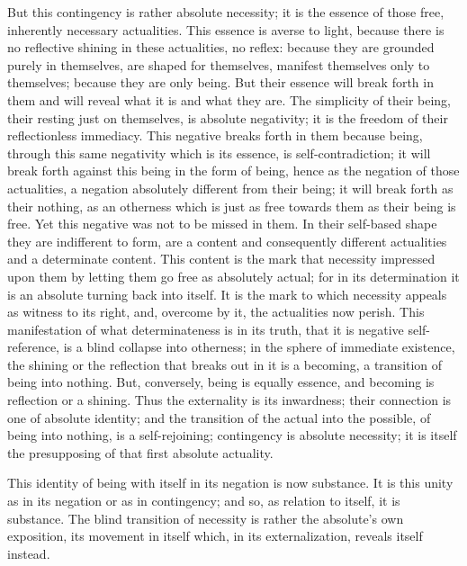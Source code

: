 But this contingency is rather absolute necessity;
it is the essence of those free, inherently necessary actualities.
This essence is averse to light, because there is
no reflective shining in these actualities,
no reflex: because they
are  grounded purely in themselves,
are shaped for themselves,
manifest themselves only to themselves;
because they are only being.
But their essence will break forth in them
and will reveal what it is and what they are.
The simplicity of their being, their resting just on themselves,
is absolute negativity; it is the freedom of their reflectionless immediacy.
This negative breaks forth in them because being,
through this same negativity which is its essence, is self-contradiction;
it will break forth against this being in the form of being,
hence as the negation of those actualities,
a negation absolutely different from their being;
it will break forth as their nothing, as an
otherness which is just as free towards them as their being is free.
Yet this negative was not to be missed in them.
In their self-based shape they are indifferent to form,
are a content and consequently different actualities and a
determinate content.
This content is the mark that necessity impressed upon them
by letting them go free as absolutely actual;
for in its determination it is an absolute turning back into itself.
It is the mark to which necessity appeals as witness to its right,
and, overcome by it, the actualities now perish.
This manifestation of what determinateness is in its truth,
that it is negative self-reference, is a blind collapse into otherness;
in the sphere of immediate existence, the shining
or the reflection that breaks out in it is a becoming,
a transition of being into nothing.
But, conversely, being is equally essence,
and becoming is reflection or a shining.
Thus the externality is its inwardness;
their connection is one of absolute identity;
and the transition of the actual into the possible,
of being into nothing, is a self-rejoining;
contingency is absolute necessity;
it is itself the presupposing of that
first absolute actuality.

This identity of being with itself in its negation is now substance.
It is this unity as in its negation or as in contingency;
and so, as relation to itself, it is substance.
The blind transition of necessity is rather the absolute's own exposition,
its movement in itself which, in its externalization, reveals itself instead.
